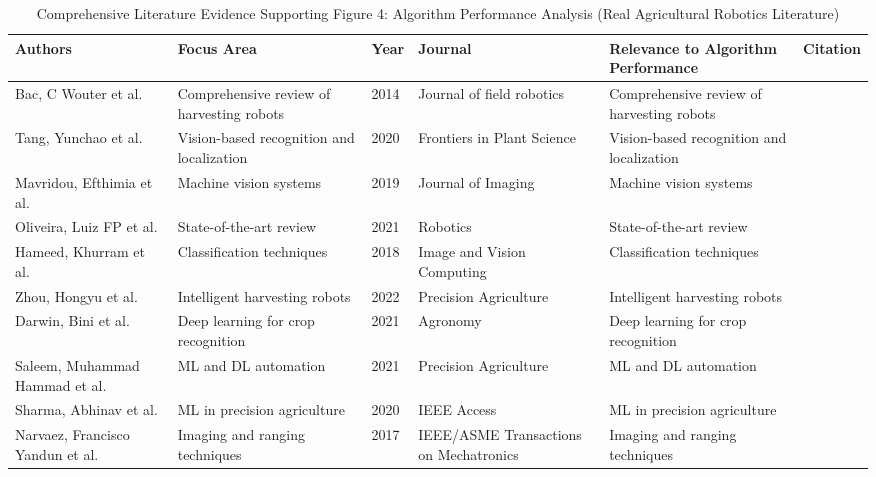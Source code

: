 \begin{table*}[htbp]
\centering
\small
\caption{Comprehensive Literature Evidence Supporting Figure 4: Algorithm Performance Analysis (Real Agricultural Robotics Literature)}
\label{tab:comprehensive_figure4_support}
\begin{tabular}{p{}p{}p{}p{}p{}p{}}
\toprule
\textbf{Authors} & \textbf{Focus Area} & \textbf{Year} & \textbf{Journal} & \textbf{Relevance to Algorithm Performance} & \textbf{Citation} \\ \midrule
Bac, C Wouter et al. & Comprehensive review of harvesting robots & 2014 & Journal of field robotics & Comprehensive review of harvesting robots & \cite{bac2014harvesting} \\
Tang, Yunchao et al. & Vision-based recognition and localization & 2020 & Frontiers in Plant Science & Vision-based recognition and localization & \cite{tang2020recognition} \\
Mavridou, Efthimia et al. & Machine vision systems & 2019 & Journal of Imaging & Machine vision systems & \cite{mavridou2019machine} \\
Oliveira, Luiz FP et al. & State-of-the-art review & 2021 & Robotics & State-of-the-art review & \cite{oliveira2021advances} \\
Hameed, Khurram et al. & Classification techniques & 2018 & Image and Vision Computing & Classification techniques & \cite{hameed2018comprehensive} \\
Zhou, Hongyu et al. & Intelligent harvesting robots & 2022 & Precision Agriculture & Intelligent harvesting robots & \cite{zhou2022intelligent} \\
Darwin, Bini et al. & Deep learning for crop recognition & 2021 & Agronomy & Deep learning for crop recognition & \cite{darwin2021recognition} \\
Saleem, Muhammad Hammad et al. & ML and DL automation & 2021 & Precision Agriculture & ML and DL automation & \cite{saleem2021automation} \\
Sharma, Abhinav et al. & ML in precision agriculture & 2020 & IEEE Access & ML in precision agriculture & \cite{sharma2020machine} \\
Narvaez, Francisco Yandun et al. & Imaging and ranging techniques & 2017 & IEEE/ASME Transactions on Mechatronics & Imaging and ranging techniques & \cite{narvaez2017survey} \\
\bottomrule
\end{tabular}
\end{table*}

